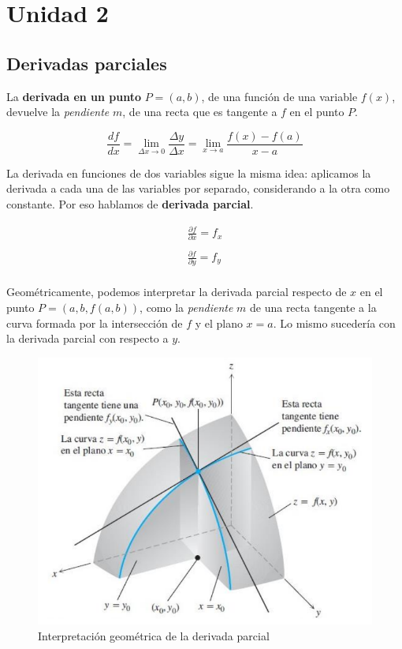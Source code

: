 \section{Unidad 2}

\subsection{Derivadas parciales}

La \textbf{derivada en un punto} \(P = (a,b)\),
de una función de una variable \(f(x)\),
devuelve la \textit{pendiente} \(m\),
de una recta que es tangente a \(f\) en el punto \(P\).

\vspace{.25cm}
\begin{equation*}
    \frac{df}{dx} = \lim_{\Delta x \to 0}\frac{\Delta y}{\Delta x} =
    \lim_{x \to a}\frac{f(x) - f(a)}{x-a}
\end{equation*}
\vspace{.25cm}

La derivada en funciones de dos variables sigue la misma idea:
aplicamos la derivada a cada una de las variables por separado,
considerando a la otra como constante.
Por eso hablamos de \textbf{derivada parcial}.

\begin{align*}
    \frac{\partial f}{\partial x} = f_x \\
    \\
    \frac{\partial f}{\partial y} = f_y \\
\end{align*}

Geométricamente,
podemos interpretar la derivada parcial respecto de \(x\)
en el punto \(P = (a, b, f(a,b))\),
como la \textit{pendiente} \(m\) de una recta tangente a la curva formada por
la intersección de \(f\) y el plano \(x = a\).
Lo mismo sucedería con la derivada parcial con respecto a \(y\).

\begin{figure}[H]
    \centering
    \caption{Interpretación geométrica de la derivada parcial}
    \includegraphics[scale=.8]{./img/01-02-derivada-parcial-geometrica.png}
\end{figure}

